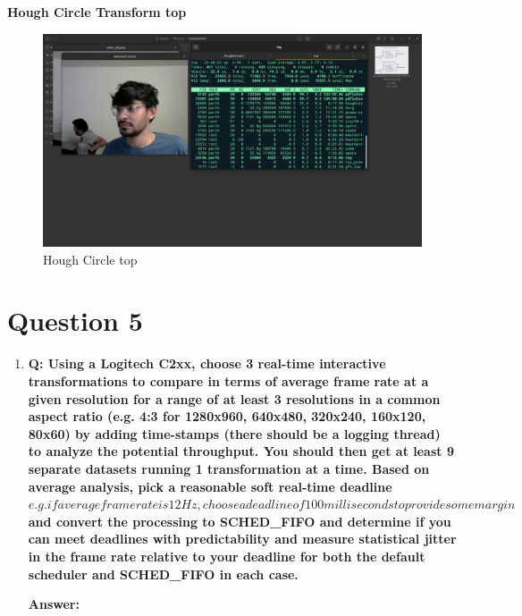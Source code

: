 \documentclass[a4paper,11pt]{article}%
\newenvironment{qanda}{\setlength{\parindent}{0pt}}{\bigskip}
\newcommand{\Q}{\bigskip\bfseries Q: }
\newcommand{\A}{\par\textbf{Answer: } \normalfont}
\begin{document}
\begin{qanda}
\begin{enumerate}
\textbf{Hough Circle Transform top}
\begin{figure}[H]
	\centering
	\includegraphics[scale=0.25]{figures/hc_htop.png}
	\caption{Hough Circle top}
\end{figure}			

	\end{enumerate}

	\section{Question 5}
	\begin{enumerate}
		\item[] \Q Using a Logitech C2xx, choose 3 real-time interactive transformations to compare in terms of
			average frame rate at a given resolution for a range of at least 3 resolutions in a common aspect
			ratio (e.g. 4:3 for 1280x960, 640x480, 320x240, 160x120, 80x60) by adding time-stamps (there
			should be a logging thread) to analyze the potential throughput. You should then get at least 9
			separate datasets running 1 transformation at a time. Based on average analysis, pick a
			reasonable soft real-time deadline \(e.g. if average frame rate is 12 Hz, choose a deadline of 100
			milliseconds to provide some margin\) and convert the processing to SCHED\_FIFO and
			determine if you can meet deadlines with predictability and measure statistical jitter in the frame
			rate relative to your deadline for both the default scheduler and SCHED\_FIFO in each case.
			\A


\end{enumerate}
\end{qanda}
\end{document}
